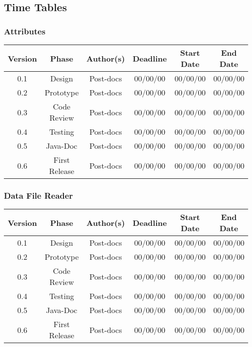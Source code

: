 \newpage
\subsection{Time Tables}

\subsubsection*{Attributes}

\begin{table}[H]
\begin{tabular}{cccccc}
\hline
\textbf{Version} & \textbf{Phase} & \textbf{Author(s)} & \textbf{Deadline} & \textbf{Start Date} & \textbf{End Date}\\
\hline
0.1 & Design & Post-docs & 00/00/00 & 00/00/00 & 00/00/00\\
\hline 
0.2 & Prototype & Post-docs & 00/00/00 & 00/00/00 & 00/00/00\\
\hline 
0.3 & Code Review & Post-docs & 00/00/00 & 00/00/00 & 00/00/00\\
\hline 
0.4 & Testing & Post-docs & 00/00/00 & 00/00/00 & 00/00/00\\
\hline 
0.5 & Java-Doc  & Post-docs & 00/00/00 & 00/00/00 & 00/00/00\\
\hline 
0.6 & First Release & Post-docs & 00/00/00 & 00/00/00 & 00/00/00\\
\hline
\end{tabular}
\end{table}

\subsubsection*{Data File Reader}

\begin{table}[H]
\begin{tabular}{cccccc}
\hline
\textbf{Version} & \textbf{Phase} & \textbf{Author(s)} & \textbf{Deadline} & \textbf{Start Date} & \textbf{End Date}\\
\hline
0.1 & Design & Post-docs & 00/00/00 & 00/00/00 & 00/00/00\\
\hline 
0.2 & Prototype & Post-docs & 00/00/00 & 00/00/00 & 00/00/00\\
\hline 
0.3 & Code Review & Post-docs & 00/00/00 & 00/00/00 & 00/00/00\\
\hline 
0.4 & Testing & Post-docs & 00/00/00 & 00/00/00 & 00/00/00\\
\hline 
0.5 & Java-Doc  & Post-docs & 00/00/00 & 00/00/00 & 00/00/00\\
\hline 
0.6 & First Release & Post-docs & 00/00/00 & 00/00/00 & 00/00/00\\
\hline
\end{tabular}
\end{table}

